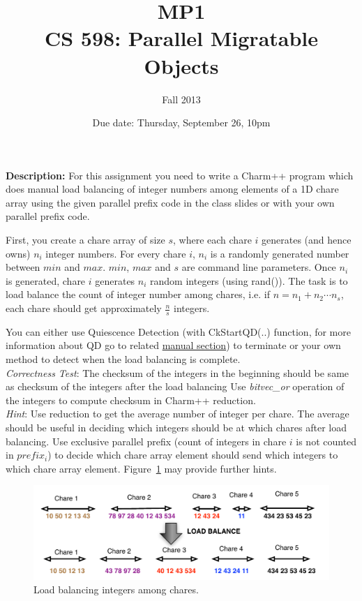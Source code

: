 \documentclass{article}
\title{MP1 \\ CS 598: Parallel Migratable Objects}
\author{Fall 2013}
\date{Due date: Thursday, September 26, 10pm}
\begin{document}
\maketitle

\textbf{Description:} 
For this assignment you need to write a Charm++ program which does manual load
balancing of integer numbers among elements of a 1D chare array using the 
given parallel prefix code in the class slides or with your own parallel 
prefix code. 

First, you create a chare array of size $s$, where each chare $i$ generates 
(and hence owns) $n_i$ integer numbers. For every chare $i$, $n_i$ is a 
randomly generated number between $min$ and $max$. 
$min$, $max$ and $s$ are command line parameters. 
Once $n_i$ is generated, chare $i$ generates $n_i$ random 
integers (using rand()). The task is to load balance the count
of integer number among chares, i.e. if $n = n_1 + n_2 \cdots n_s$,
each chare should get approximately $\frac{n}{s}$ integers.

You can either use Quiescence Detection (with CkStartQD(..) function, for more
information about QD go to related
\href{http://charm.cs.illinois.edu/manuals/html/charm++/12.html#SECTION02350000000000000000}{manual
section}) to terminate or your own method to detect when
the load balancing is complete. \\

\emph{Correctness Test}: The checksum of the integers in the beginning
should be same as checksum of the integers after the load balancing
Use \emph{bitvec\_or} operation of the integers to compute checksum in Charm++
reduction. \\

\emph{Hint}: Use reduction to get the average number of integer per chare. 
The average should be useful in deciding which integers should be at which chares
after load balancing. Use exclusive parallel prefix (count of integers in chare $i$
is not counted in $prefix_i $) to decide which chare array element 
should send which integers to which chare array element. Figure~\ref{prefix}
may provide further hints. \\

\begin{figure}[h]
\centering
\includegraphics[width=\textwidth]{prob1.pdf}
\caption{Load balancing integers among chares.}
\label{prefix}
\end{figure}
\end{document}
